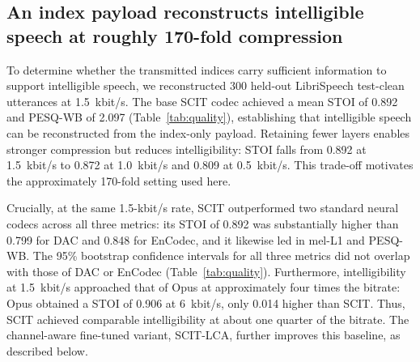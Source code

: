 \documentclass[final,5p,times,twocolumn]{elsarticle}
\begin{document}
\subsection{An index payload reconstructs intelligible speech at roughly 170-fold compression}
To determine whether the transmitted indices carry sufficient information to support intelligible speech, we reconstructed 300 held-out LibriSpeech test-clean utterances at 1.5~kbit/s. The base SCIT codec achieved a mean STOI of 0.892 and PESQ-WB of 2.097 (Table~\ref{tab:quality}), establishing that intelligible speech can be reconstructed from the index-only payload. Retaining fewer layers enables stronger compression but reduces intelligibility: STOI falls from 0.892 at 1.5~kbit/s to 0.872 at 1.0~kbit/s and 0.809 at 0.5~kbit/s. This trade-off motivates the approximately 170-fold setting used here.

Crucially, at the same 1.5-kbit/s rate, SCIT outperformed two standard neural codecs across all three metrics: its STOI of 0.892 was substantially higher than 0.799 for DAC and 0.848 for EnCodec, and it likewise led in mel-L1 and PESQ-WB. The 95\% bootstrap confidence intervals for all three metrics did not overlap with those of DAC or EnCodec (Table~\ref{tab:quality}). Furthermore, intelligibility at 1.5~kbit/s approached that of Opus at approximately four times the bitrate: Opus obtained a STOI of 0.906 at 6~kbit/s, only 0.014 higher than SCIT. Thus, SCIT achieved comparable intelligibility at about one quarter of the bitrate. The channel-aware fine-tuned variant, SCIT-LCA, further improves this baseline, as described below.
\end{document}
